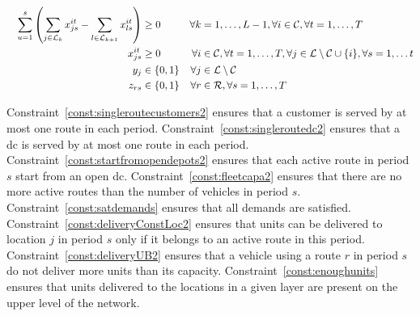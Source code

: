 \begin{alignat}{3}
    &&\sum_{u=1}^s \left(\sum_{j\in\mathcal{L}_{k}} x^{it}_{js} - \sum_{l\in\mathcal{L}_{k+1}} x^{it}_{ls}\right) &\geq 0\quad 			&\forall k&=1,\ldots,L-1, \forall i\in\mathcal{C}, \forall t=1,\ldots,T \label{const:enoughunits}\\
    &&x^{it}_{js}			&\geq 0 															&\forall i&\in \mathcal{C},\forall t=1,\ldots, T, \forall j\in \mathcal{L}\setminus\mathcal{C}\cup\{i\}, \forall s= 1,\ldots t\label{const:upos2}	\\
    &&y_{j}					& \in \{0,1\} 														&\forall j&\in \mathcal{L}\setminus\mathcal{C}\label{const:ybool2}\\	
    &&z_{rs}					&\in \{0,1\} 														&\forall r&\in \mathcal{R}, \forall s=1,\ldots,T\label{const:zbool2}
\end{alignat}

Constraint~\eqref{const:singleroutecustomers2} ensures that a customer is served by at most one route in each period.
Constraint~\eqref{const:singleroutedc2} ensures that a dc is served by at most one route in each period.
Constraint~\eqref{const:startfromopendepots2} ensures that each active route in period $s$ start from an open dc.
Constraint~\eqref{const:fleetcapa2} ensures that there are no more active routes than the number of vehicles in period $s$.
Constraint~\eqref{const:satdemands} ensures that all demands are satisfied.
Constraint~\eqref{const:deliveryConstLoc2} ensures that units can be delivered to location $j$ in period $s$ only if it belongs to an active route in this period.
Constraint~\eqref{const:deliveryUB2} ensures that a vehicle using a route $r$ in period $s$ do not deliver more units than its capacity.
Constraint~\eqref{const:enoughunits} ensures that units delivered to the locations in a given layer are present on the upper level of the network.
